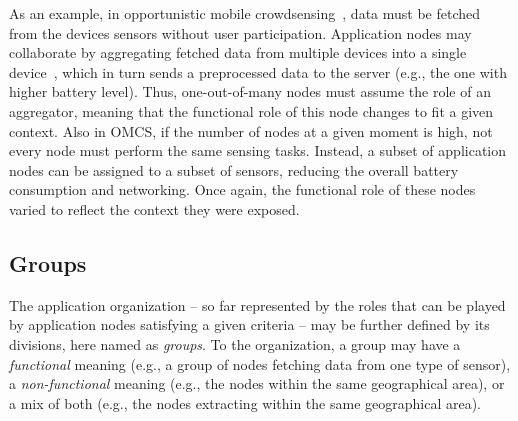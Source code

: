 As an example, in opportunistic mobile crowdsensing~\cite{OMCS}, data must be fetched from the devices sensors without user participation. Application nodes may collaborate by aggregating fetched data from multiple devices into a single device~\cite{Rajagopalan:2006}, which in turn sends a preprocessed data to the server (e.g., the one with higher battery level). Thus, one-out-of-many nodes must assume the role of an aggregator, meaning that the functional role of this node changes to fit a given context. Also in OMCS, if the number of nodes at a given moment is high, not every node must perform the same sensing tasks. Instead, a subset of application nodes can be assigned to a subset of sensors, reducing the overall battery consumption and networking. Once again, the functional role of these nodes varied to reflect the context they were exposed. 




\subsection{Groups}




The application organization -- so far represented by the roles that can be played by application nodes satisfying a given criteria -- may be further defined by its divisions, here named as \textit{groups}. To the organization, a group may have a \textit{functional} meaning (e.g., a group of nodes fetching data from one type of sensor), a \textit{non-functional} meaning (e.g., the nodes within the same geographical area), or a mix of both (e.g., the nodes extracting within the same geographical area). 

